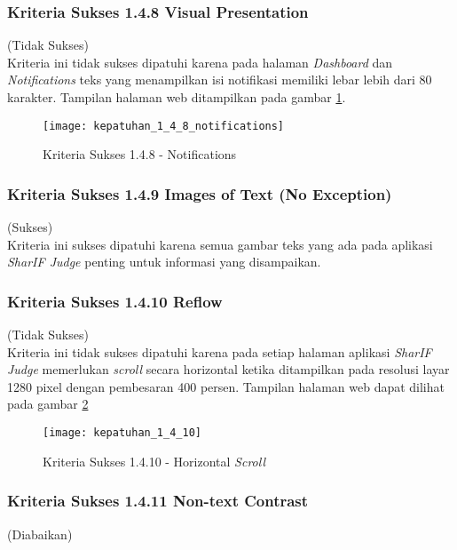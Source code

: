 \subsubsection{Kriteria Sukses 1.4.8 Visual Presentation}
\label{subsubsec:kepatuhan_kriteria_1.4.8}
(Tidak Sukses) \\

Kriteria ini tidak sukses dipatuhi karena pada halaman \textit{Dashboard} dan \textit{Notifications} teks yang menampilkan isi notifikasi memiliki lebar lebih dari 80 karakter. Tampilan halaman web ditampilkan pada gambar \ref{fig:kepatuhan_1_4_8_notifications}.
\begin{figure}[H]
	\centering  
	\texttt{[image: kepatuhan\_1\_4\_8\_notifications]}  
	\caption[Kriteria Sukses 1.4.8 - Notifications]{Kriteria Sukses 1.4.8 - Notifications} 
	\label{fig:kepatuhan_1_4_8_notifications} 
\end{figure}

\subsubsection{Kriteria Sukses 1.4.9 Images of Text (No Exception)}
\label{subsubsec:kepatuhan_kriteria_1.4.9}
(Sukses) \\

Kriteria ini sukses dipatuhi karena semua gambar teks yang ada pada aplikasi \textit{SharIF Judge} penting untuk informasi yang disampaikan.

\subsubsection{Kriteria Sukses 1.4.10 Reflow}
\label{subsubsec:kepatuhan_kriteria_1.4.10}
(Tidak Sukses) \\

Kriteria ini tidak sukses dipatuhi karena pada setiap halaman aplikasi \textit{SharIF Judge} memerlukan \textit{scroll} secara horizontal ketika ditampilkan pada resolusi layar 1280 pixel dengan pembesaran 400 persen. Tampilan halaman web dapat dilihat pada gambar \ref{fig:kepatuhan_1_4_10_reflow}
\begin{figure}[H]
	\centering  
	\texttt{[image: kepatuhan\_1\_4\_10]}  
	\caption[Kriteria Sukses 1.4.10 - Horizontal \textit{Scroll}]{Kriteria Sukses 1.4.10 - Horizontal \textit{Scroll}} 
	\label{fig:kepatuhan_1_4_10_reflow} 
\end{figure}

\subsubsection{Kriteria Sukses 1.4.11 Non-text Contrast}
\label{subsubsec:kepatuhan_kriteria_1.4.11}
(Diabaikan) \\

